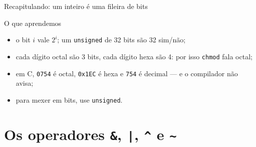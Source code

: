 \documentclass[aspectratio=169]{beamer}
\newcommand{\til}{\textasciitilde}
\newcommand{\cir}{\textasciicircum}
\begin{document}
\begin{frame}{Recapitulando: um inteiro é uma fileira de bits}
  \begin{block}{O que aprendemos}
    \begin{itemize}
      \item o bit $i$ vale $2^i$; um \texttt{unsigned} de 32 bits são 32
        sim/não;
      \item cada dígito octal são 3 bits, cada dígito hexa são 4: por isso
        \texttt{chmod} fala octal;
      \item em C, \texttt{0754} é octal, \texttt{0x1EC} é hexa e \texttt{754}
        é decimal --- e o compilador não avisa;
      \item para mexer em bits, use \texttt{unsigned}.
    \end{itemize}
  \end{block}
\end{frame}

\section{Os operadores \texttt{\&}, \texttt{|}, \texttt{\cir} e \texttt{\til}}
\end{document}
